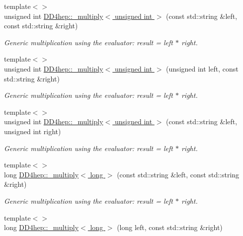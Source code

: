 \begin{DoxyCompactItemize}
{\footnotesize template$<$$>$ }\\unsigned int \hyperlink{group___d_d4_h_e_p___g_e_o_m_e_t_r_y_ga98d2080e984813108ebf14ea52c47482}{DD4hep::\_\-multiply$<$ unsigned int $>$} (const std::string \&left, const std::string \&right)
\begin{DoxyCompactList}\small\item\em Generic multiplication using the evaluator: result = left $\ast$ right. \item\end{DoxyCompactList}\item 
{\footnotesize template$<$$>$ }\\unsigned int \hyperlink{group___d_d4_h_e_p___g_e_o_m_e_t_r_y_ga90d32d251543997f58bfe3d928d2a1eb}{DD4hep::\_\-multiply$<$ unsigned int $>$} (unsigned int left, const std::string \&right)
\begin{DoxyCompactList}\small\item\em Generic multiplication using the evaluator: result = left $\ast$ right. \item\end{DoxyCompactList}\item 
{\footnotesize template$<$$>$ }\\unsigned int \hyperlink{group___d_d4_h_e_p___g_e_o_m_e_t_r_y_ga730223da6400b68727363b3e0af02295}{DD4hep::\_\-multiply$<$ unsigned int $>$} (const std::string \&left, unsigned int right)
\begin{DoxyCompactList}\small\item\em Generic multiplication using the evaluator: result = left $\ast$ right. \item\end{DoxyCompactList}\item 
{\footnotesize template$<$$>$ }\\long \hyperlink{group___d_d4_h_e_p___g_e_o_m_e_t_r_y_gaafbe9fe15bbee4c4cdba40656afa20b1}{DD4hep::\_\-multiply$<$ long $>$} (const std::string \&left, const std::string \&right)
\begin{DoxyCompactList}\small\item\em Generic multiplication using the evaluator: result = left $\ast$ right. \item\end{DoxyCompactList}\item 
{\footnotesize template$<$$>$ }\\long \hyperlink{group___d_d4_h_e_p___g_e_o_m_e_t_r_y_ga0536df8e24d4ddb71df72fcbcfab09f0}{DD4hep::\_\-multiply$<$ long $>$} (long left, const std::string \&right)

\end{DoxyCompactItemize}
